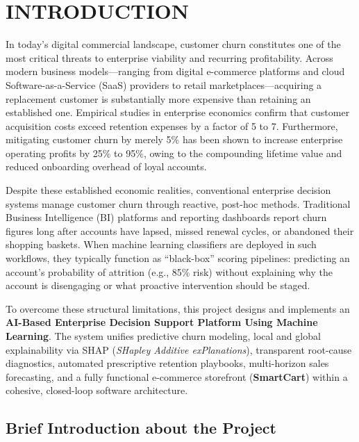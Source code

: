 \documentclass[12pt,a4paper]{article}
\begin{document}
\pagestyle{reportbody}

\section{INTRODUCTION}\label{chap:1}

In today's digital commercial landscape, customer churn constitutes one of the most critical threats to enterprise viability and recurring profitability. Across modern business models---ranging from digital e-commerce platforms and cloud Software-as-a-Service (SaaS) providers to retail marketplaces---acquiring a replacement customer is substantially more expensive than retaining an established one. Empirical studies in enterprise economics confirm that customer acquisition costs exceed retention expenses by a factor of 5 to 7. Furthermore, mitigating customer churn by merely 5\% has been shown to increase enterprise operating profits by 25\% to 95\%, owing to the compounding lifetime value and reduced onboarding overhead of loyal accounts.

Despite these established economic realities, conventional enterprise decision systems manage customer churn through reactive, post-hoc methods. Traditional Business Intelligence (BI) platforms and reporting dashboards report churn figures long after accounts have lapsed, missed renewal cycles, or abandoned their shopping baskets. When machine learning classifiers are deployed in such workflows, they typically function as ``black-box'' scoring pipelines: predicting an account's probability of attrition (e.g., 85\% risk) without explaining why the account is disengaging or what proactive intervention should be staged. 

To overcome these structural limitations, this project designs and implements an \textbf{AI-Based Enterprise Decision Support Platform Using Machine Learning}. The system unifies predictive churn modeling, local and global explainability via SHAP (\textit{SHapley Additive exPlanations}), transparent root-cause diagnostics, automated prescriptive retention playbooks, multi-horizon sales forecasting, and a fully functional e-commerce storefront (\textbf{SmartCart}) within a cohesive, closed-loop software architecture.

\subsection{Brief Introduction about the Project}\label{sub:1.1}
\end{document}

